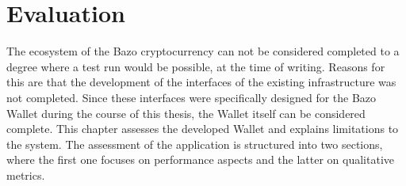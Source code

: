 \chapter{Evaluation}
The ecosystem of the Bazo cryptocurrency can not be considered completed to a degree where a test run would be possible, at the time of writing. Reasons for this are that the development of the interfaces of the existing infrastructure was not completed. Since these interfaces were specifically designed for the Bazo Wallet during the course of this thesis, the Wallet itself can be considered complete. This chapter assesses the developed Wallet and explains limitations to the system. The assessment of the application is structured into two sections, where the first one focuses on performance aspects and the latter on qualitative metrics.


